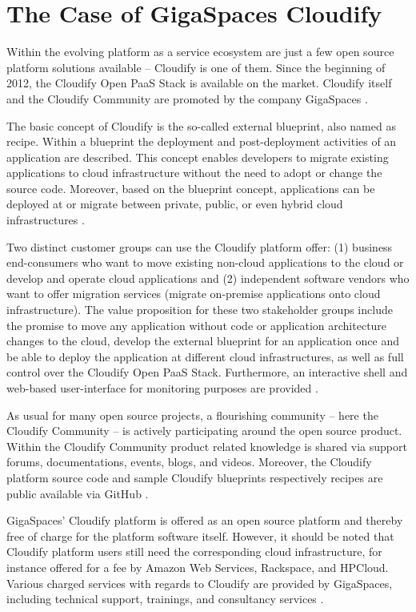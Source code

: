 \section{The Case of GigaSpaces Cloudify}

Within the evolving platform as a service ecosystem are just a few open source platform solutions available -- Cloudify is one of them. Since the beginning of 2012, the Cloudify Open PaaS Stack is available on the market. Cloudify itself and the Cloudify Community are promoted by the company GigaSpaces \citep{GigaSpaces2013a}.

The basic concept of Cloudify is the so-called external blueprint, also named as recipe. Within a blueprint the deployment and post-deployment activities of an application are described. This concept enables developers to migrate existing applications to cloud infrastructure without the need to adopt or change the source code. Moreover, based on the blueprint concept, applications can be deployed at or migrate between private, public, or even hybrid cloud infrastructures \citep{GigaSpaces2013a}.

Two distinct customer groups can use the Cloudify platform offer: (1) business end-consumers who want to move existing non-cloud applications to the cloud or develop and operate cloud applications and (2) independent software vendors who want to offer migration services (migrate on-premise applications onto cloud infrastructure). The value proposition for these two stakeholder groups include the promise to move any application without code or application architecture changes to the cloud, develop the external blueprint for an application once and be able to deploy the application at different cloud infrastructures, as well as full control over the Cloudify Open PaaS Stack. Furthermore, an interactive shell and web-based user-interface for monitoring purposes are provided \citep{GigaSpaces2013a}.

As usual for many open source projects, a flourishing community -- here the Cloudify Community -- is actively participating around the open source product. Within the Cloudify Community product related knowledge is shared via support forums, documentations, events, blogs, and videos. Moreover, the Cloudify platform source code and sample Cloudify blueprints respectively recipes are public available via GitHub \citep{GigaSpaces2013b,GitHub2013,GitHub2013a}.

GigaSpaces' Cloudify platform is offered as an open source platform and thereby free of charge for the platform software itself. However, it should be noted that Cloudify platform users still need the corresponding cloud infrastructure, for instance offered for a fee by Amazon Web Services, Rackspace, and HPCloud. Various charged services with regards to Cloudify are provided by GigaSpaces, including technical support, trainings, and consultancy services \citep{GigaSpaces2013a}.


